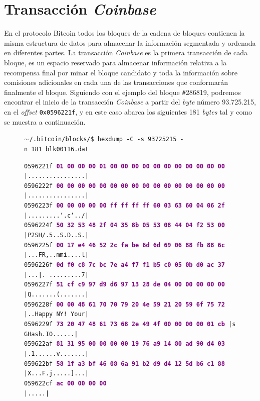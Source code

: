 \documentclass{article}
\begin{document}
\section{Transacción \textit{Coinbase}}
    En el protocolo Bitcoin todos los bloques de la cadena de bloques contienen la misma estructura de datos para almacenar la información segmentada y ordenada en diferentes partes. La transacción \textit{Coinbase} es la primera transacción de cada bloque, es un espacio reservado para almacenar información relativa a la recompensa final por minar el bloque candidato y toda la información sobre comisiones adicionales en cada una de las transacciones que conformarán finalmente el bloque. Siguiendo con el ejemplo del bloque \texttt{\#}286819, podremos encontrar el inicio de la transacción \textit{Coinbase} a partir del \textit{byte} número 93.725.215, en el \textit{offset} \texttt{0x0596221f}, y en este caso abarca los siguientes 181 \textit{bytes} tal y como se muestra a continuación.
    \begin{figure}[H]
    \scriptsize{\texttt{$\sim$/.bitcoin/blocks/\$ hexdump\ -C\ -s\ 93725215\ -n\ 181\ blk00116.dat}}
        
        \scriptsize{
        \texttt{0596221f \textbf{\textcolor{purple}{01 00 00 00 01 00 00 00  00 00 00 00 00 00 00 00}} |................|} \\
        \texttt{0596222f \textbf{\textcolor{purple}{00 00 00 00 00 00 00 00  00 00 00 00 00 00 00 00}} |................|} \\
        \texttt{0596223f \textbf{\textcolor{purple}{00 00 00 00 00 ff ff ff  ff 60 03 63 60 04 06 2f}} |.........`.c`../|} \\
        \texttt{0596224f \textbf{\textcolor{purple}{50 32 53 48 2f 04 35 8b  05 53 08 44 04 f2 53 00}} |P2SH/.5..S.D..S.|} \\
        \texttt{0596225f \textbf{\textcolor{purple}{00 17 e4 46 52 2c fa be  6d 6d 69 06 88 fb 88 6c}} |...FR,..mmi....l|} \\
        \texttt{0596226f \textbf{\textcolor{purple}{0d f0 c8 7c bc 7e a4 f7  f1 b5 c0 05 0b d0 ac 37}} |...|.~.........7|} \\
        \texttt{0596227f \textbf{\textcolor{purple}{51 cf c9 97 d9 d6 97 13  28 de 04 00 00 00 00 00}} |Q.......(.......|} \\
        \texttt{0596228f \textbf{\textcolor{purple}{00 00 48 61 70 70 79 20  4e 59 21 20 59 6f 75 72}} |..Happy NY! Your|} \\
        \texttt{0596229f \textbf{\textcolor{purple}{73 20 47 48 61 73 68 2e  49 4f 00 00 00 00 01 cb}} |s GHash.IO......|} \\
        \texttt{059622af \textbf{\textcolor{purple}{81 31 95 00 00 00 00 19  76 a9 14 80 ad 90 d4 03}} |.1......v.......|} \\
        \texttt{059622bf \textbf{\textcolor{purple}{58 1f a3 bf 46 08 6a 91  b2 d9 d4 12 5d b6 c1 88}} |X...F.j.....]...|} \\
        \texttt{059622cf \textbf{\textcolor{purple}{ac 00 00 00 00 \ \ \ \ \ \ \ \ \ \ \ \ \ \ \ \ \ \ \ \ \ \ \ \ \ \ \ \ \ \ \ \ }} |.....|}}
    \end{figure}
    
\end{document}
